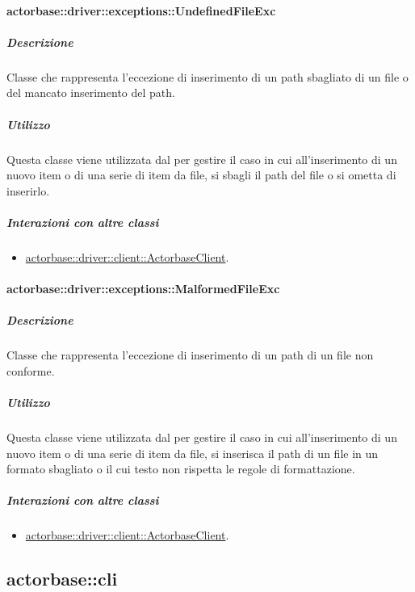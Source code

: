 \documentclass{scalatekids-article}
\begin{document}
\paragraph{actorbase::driver::exceptions::UndefinedFileExc}

\subparagraph{Descrizione}

Classe che rappresenta l'eccezione di inserimento di un path sbagliato di un file o del mancato inserimento del path.

\subparagraph{Utilizzo}

Questa classe viene utilizzata dal  per gestire il caso in cui all'inserimento di un nuovo item o di una serie di item da file, si sbagli il path del file o si ometta di inserirlo.

\subparagraph{Interazioni con altre classi}

\begin{itemize}
\item \hyperref[sec:actorbase::driver::client::ActorbaseClient]{actorbase::driver::client::ActorbaseClient}.
\end{itemize}

\paragraph{actorbase::driver::exceptions::MalformedFileExc}

\subparagraph{Descrizione}

Classe che rappresenta l'eccezione di inserimento di un path di un file non conforme.

\subparagraph{Utilizzo}

Questa classe viene utilizzata dal  per gestire il caso in cui all'inserimento di un nuovo item o di una serie di item da file, si inserisca il path di un file in un formato sbagliato o il cui testo non rispetta le regole di formattazione.

\subparagraph{Interazioni con altre classi}

\begin{itemize}
\item \hyperref[sec:actorbase::driver::client::ActorbaseClient]{actorbase::driver::client::ActorbaseClient}.
\end{itemize}


\subsection{actorbase::cli}
\label{sec:actorbase::cli}
\end{document}
